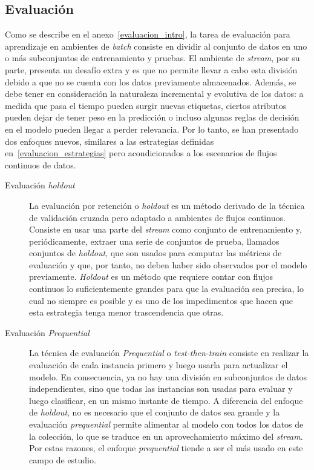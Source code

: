 \subsection{Evaluación}
\label{stream_evaluacion}

Como se describe en el anexo~\ref{evaluacion_intro}, la tarea de evaluación para
aprendizaje en ambientes de \textit{batch} consiste en dividir al conjunto de
datos en uno o más subconjuntos de entrenamiento y pruebas.  El ambiente de
\textit{stream}, por su parte, presenta un desafío extra y es que no permite
llevar a cabo esta división debido a que no se cuenta con los datos previamente
almacenados. Además, se debe tener en consideración la naturaleza incremental y
evolutiva de los datos: a medida que pasa el tiempo pueden surgir nuevas
etiquetas, ciertos atributos pueden dejar de tener peso en la predicción o
incluso algunas reglas de decisión en el modelo pueden llegar a perder
relevancia. Por lo tanto, se han presentado dos enfoques nuevos, similares a las
estrategias definidas en~\ref{evaluacion_estrategias} pero acondicionados a los
escenarios de flujos continuos de datos.

\begin{description}

	\item[Evaluación \textit{holdout}] La evaluación por retención o
	      \textit{holdout} es un método derivado de la técnica de validación cruzada
	      pero adaptado a ambientes de flujos continuos. Consiste en usar una parte
	      del \textit{stream} como conjunto de entrenamiento y, periódicamente,
	      extraer una serie de conjuntos de prueba, llamados conjuntos de
	      \textit{holdout}, que son usados para computar las métricas de evaluación
	      y que, por tanto, no deben haber sido observados por el modelo
	      previamente.  \textit{Holdout} es un método que requiere contar con flujos
	      continuos lo suficientemente grandes para que la evaluación sea precisa,
	      lo cual no siempre es posible y es uno de los impedimentos que hacen que
	      esta estrategia tenga menor trascendencia que otras.

	\item[Evaluación \textit{Prequential}] La técnica de evaluación
	      \textit{Prequential} o \textit{test-then-train} consiste en realizar la
	      evaluación de cada instancia primero y luego usarla para actualizar el
	      modelo. En consecuencia, ya no hay una división en subconjuntos de datos
	      independientes, sino que todas las instancias son usadas para evaluar y
	      luego clasificar, en un mismo instante de tiempo. A diferencia del enfoque
	      de \textit{holdout}, no es necesario que el conjunto de datos sea grande y
	      la evaluación \textit{prequential} permite alimentar al modelo con todos
	      los datos de la colección, lo que se traduce en un aprovechamiento máximo
	      del \textit{stream}. Por estas razones, el enfoque \textit{prequential}
	      tiende a ser el más usado en este campo de estudio.

\end{description}

